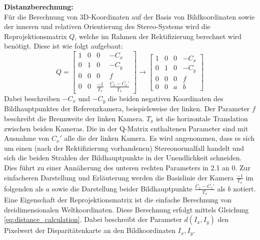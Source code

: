 \noindent
\textbf{Distanzberechnung:}\\
Für die Berechnung von 3D-Koordinaten auf der Basis von Bildkoordinaten sowie der inneren und relativen Orientierung des Stereo-Systems wird die Reprojektionsmatrix $Q$, welche im Rahmen der Rektifizierung berechnet wird benötigt. Diese ist wie folgt aufgebaut:
\begin{equation}
    Q= 
    \begin{bmatrix}
      1 & 0 & 0 & -C_x\\
      0 & 1 & 0 & -C_y\\
      0 & 0 & 0 & f\\
      0 & 0 & \frac{-1}{T_x} & \frac{C_x - C_x'}{T_x}
    \end{bmatrix}
    \longrightarrow
    \begin{bmatrix}
      1 & 0 & 0 & -C_x\\
      0 & 1 & 0 & -C_y\\
      0 & 0 & 0 & f\\
      0 & 0 & a & b
    \end{bmatrix}
\end{equation}
Dabei beschreiben $-C_x$ und $-C_y$ die beiden negativen Koordinaten des Bildhauptpunktes der Referenzkamera, beispielsweise der linken. Der Parameter $f$ beschreibt die Brennweite der linken Kamera. $T_x$ ist die horizontale Translation zwischen beiden Kameras. Die in der Q-Matrix enthaltenen Parameter sind mit Ausnahme von $C_x'$ alle die der linken Kamera. Es wird angenommen, dass es sich um einen (nach der Rektifizierung vorhandenen) Stereonormalfall handelt und sich die beiden Strahlen der Bildhauptpunkte in der Unendlichkeit schneiden. Dies führt zu einer Annäherung des unteren rechten Parameters in 2.1 an $0$. Zur einfacheren Darstellung und Erläuterung werden die Basislinie der Kamera $\frac{-1}{T_x}$ im folgenden als $a$ sowie die Darstellung beider Bildhauptpunkte $\frac{C_x - C_x'}{T_x}$ als $b$ notiert.\\

\noindent
Eine Eigenschaft der Reprojektionsmatrix ist die einfache Berechnung von dreidimensionalen Weltkoordinaten. Diese Berechnung erfolgt mittels Gleichung \ref{eq:distance_calculation}. Dabei beschreibt der Parameter $d(I_x,I_y)$ den Pixelwert der Disparitätenkarte an den Bildkoordinaten $I_x,I_y$.

